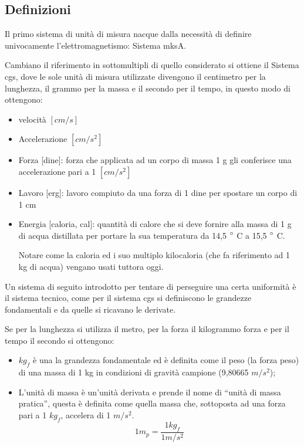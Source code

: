 \documentclass[a4paper, 15pt]{article}
\begin{document}
\subsection{Definizioni}
\begin{adjustwidth}{2in}{}
	Il primo sistema di unità di misura nacque dalla necessità di definire univocamente l'elettromagnetismo: Sistema mksA. 
	
	Cambiano il riferimento in sottomultipli di quello considerato si ottiene il Sistema cgs, dove le sole unità di misura utilizzate divengono il centimetro per la lunghezza, il grammo per la massa e il secondo per il tempo, in questo modo di ottengono: 
	\begin{itemize}
		\item velocità $[cm/s]$
		\item Accelerazione $[cm/s^2]$
		\item Forza [dine]: forza che applicata ad un corpo di massa 1 g gli conferisce una accelerazione pari
		a 1 $[cm/s^2]$
		\item Lavoro [erg]: lavoro compiuto da una forza di 1 dine per spostare un corpo di 1 cm
		\item Energia [caloria, cal]: quantità di calore che si deve fornire alla massa di 1 g di acqua distillata per portare la
		sua temperatura da 14,5 $\degree$ C a 15,5 $\degree$ C.
		
		Notare come la caloria ed i suo multiplo kilocaloria (che fa riferimento ad 1 kg di acqua) vengano usati tuttora oggi.
	\end{itemize}

	Un sistema di seguito introdotto per tentare di perseguire una certa uniformità è il sistema tecnico, come per il sistema cgs si definiscono le grandezze fondamentali e da quelle si ricavano le derivate. 
	
	Se per la lunghezza si utilizza il metro, per la forza il kilogrammo forza e per il tempo il secondo si ottengono: 
	\begin{itemize}
	\item $kg_f$ 	è una la grandezza fondamentale ed è definita come il peso (la forza peso) di una massa di
	1 kg in condizioni di gravità campione (9,80665 $m/s^2$);
	\item L’unità di massa è un'unità derivata e prende il nome di “unità di massa
	pratica”, questa è definita come quella massa che, sottoposta ad una
	forza pari a 1 $kg_f$, accelera di 1 $m/s^2$.
	\[ 1m_p = \dfrac{1kg_f}{1m/s^2} \]	 
	\end{itemize}


\end{adjustwidth}
\end{document}
